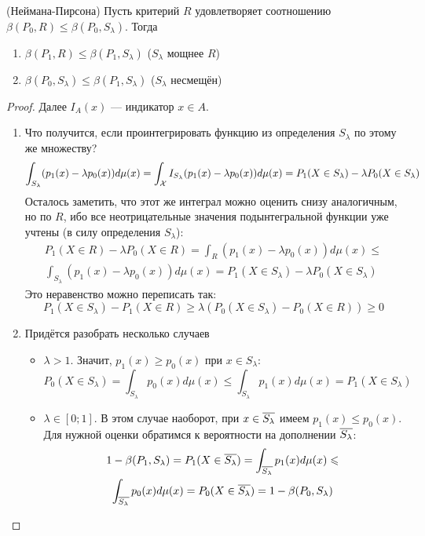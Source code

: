 \begin{lemma} (Неймана-Пирсона)
	Пусть критерий $R$ удовлетворяет соотношению $\beta(P_0, R) \le \beta(P_0, S_\lambda)$. Тогда
	\begin{enumerate}
		\item $\beta(P_1, R) \le \beta(P_1, S_\lambda)$ ($S_\lambda$ мощнее $R$)
		
		\item $\beta(P_0, S_\lambda) \le \beta(P_1, S_\lambda)$ ($S_\lambda$ несмещён)
	\end{enumerate}
\end{lemma}

\begin{proof}
	Далее $I_A(x)$ --- индикатор $x \in A$.
	\begin{enumerate}
		\item Что получится, если проинтегрировать функцию из определения $S_\lambda$ по этому же множеству?
		\[
			\int_{S_\lambda} (p_1(x) - \lambda p_0(x))d\mu(x) = \int_{\mathcal{X}} I_{S_\lambda}(p_1(x) - \lambda p_0(x))d\mu(x) =  P_1(X \in S_\lambda) - \lambda P_0(X \in S_\lambda)
		\]
		Осталось заметить, что этот же интеграл можно оценить снизу аналогичным, но по $R$, ибо все неотрицательные значения подынтегральной функции уже учтены (в силу определения $S_\lambda$):
		\begin{multline*}
			P_1(X \in R) - \lambda P_0(X \in R) = \int_R (p_1(x) - \lambda p_0(x))d\mu(x) \le
			\\
			\int_{S_\lambda} (p_1(x) - \lambda p_0(x))d\mu(x) = P_1(X \in S_\lambda) - \lambda P_0(X \in S_\lambda)
		\end{multline*}
		Это неравенство можно переписать так:
		\[
			P_1(X \in S_\lambda) - P_1(X \in R) \ge \lambda(P_0(X \in S_\lambda) - P_0(X \in R)) \ge 0
		\]
		
		\item Придётся разобрать несколько случаев
		\begin{itemize}
			\item $\lambda > 1$. Значит, $p_1(x) \ge p_0(x)$ при $x \in S_\lambda$:
			\[
				P_0(X \in S_\lambda) = \int_{S_\lambda} p_0(x)d\mu(x) \le \int_{S_\lambda} p_1(x)d\mu(x) = P_1(X \in S_\lambda)
			\]
			
			\item $\lambda \in [0; 1]$. В этом случае наоборот, при $x \in \overline{S_\lambda}$ имеем $p_1(x) \le p_0(x)$. Для нужной оценки обратимся к вероятности на дополнении $\overline{S_\lambda}$:
			\begin{multline*}
				1 - \beta(P_1, S_\lambda) = P_1(X \in \overline{S_\lambda}) = \int_{\overline{S_\lambda}} p_1(x)d\mu(x) \leqslant
				\\
				\int_{\overline{S_\lambda}} p_0(x)d\mu(x) = P_0(X \in \overline{S_\lambda}) = 1 - \beta(P_0, S_\lambda)
			\end{multline*}
		\end{itemize}
	\end{enumerate}
\end{proof}

